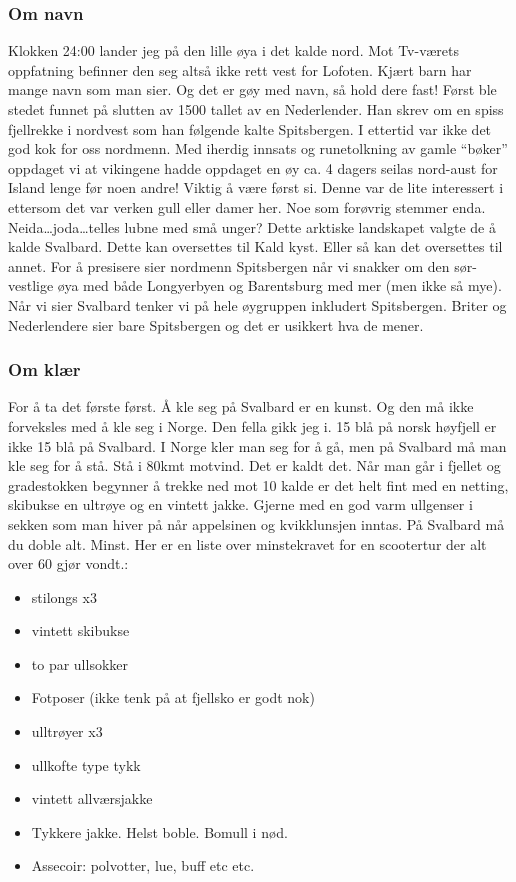 \subsubsection{Om navn}
Klokken 24:00 lander jeg på den lille øya i det kalde nord. Mot
Tv-værets oppfatning befinner den seg altså ikke rett vest for
Lofoten.
Kjært barn har mange navn som man sier. Og det er gøy med navn,  så
hold dere fast! Først ble stedet funnet på slutten av 1500 tallet av
en Nederlender. Han skrev om en spiss fjellrekke i nordvest som han
følgende kalte Spitsbergen. I ettertid var ikke det god
kok for oss nordmenn. Med iherdig innsats og runetolkning av gamle
``bøker'' oppdaget vi at vikingene hadde oppdaget en øy ca. 4 dagers
seilas nord-aust for Island lenge før noen andre! Viktig å være først
si. Denne var de lite interessert i ettersom
det var verken gull eller damer her. Noe som forøvrig stemmer enda.
Neida\ldots joda\ldots telles lubne med små unger? 
Dette arktiske landskapet valgte de å kalde Svalbard. Dette kan
oversettes til Kald kyst. Eller så kan det oversettes til annet. For å
presisere sier
nordmenn Spitsbergen når vi snakker om den sør-vestlige øya med både
Longyerbyen og Barentsburg med mer (men ikke så mye). Når vi sier
Svalbard tenker vi på hele øygruppen inkludert Spitsbergen. Briter og
Nederlendere sier bare Spitsbergen og det er usikkert hva de mener.

\subsubsection*{Om klær}

For å ta det første først. Å kle seg på Svalbard er en kunst. Og den må ikke forveksles med å kle seg
i Norge. Den fella gikk jeg i. 15 blå på norsk høyfjell er ikke 15 blå
på Svalbard. I Norge kler man  seg for å gå, men på
Svalbard må man kle seg for å stå. Stå i 80kmt motvind. Det er kaldt
det. Når man går i fjellet og gradestokken begynner å trekke
ned mot 10 kalde er det helt fint med en netting, skibukse en ultrøye
og en vintett jakke. Gjerne med en god varm ullgenser i sekken som man
hiver på når appelsinen og kvikklunsjen inntas. På Svalbard må du
doble alt. Minst. Her er en liste over minstekravet for en scootertur
der alt over 60 gjør vondt.:

\begin{itemize}
		\item stilongs x3
		\item vintett skibukse
		\item to par ullsokker
		\item Fotposer (ikke tenk på at fjellsko er godt nok)
		\item ulltrøyer x3
		\item ullkofte type tykk
		\item vintett allværsjakke
		\item Tykkere jakke. Helst boble. Bomull i nød.
		\item Assecoir: polvotter, lue, buff etc etc.
\end{itemize}

